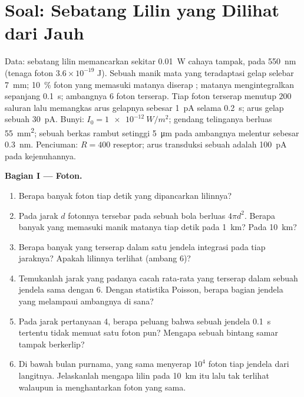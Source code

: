 \section{Soal: Sebatang Lilin yang Dilihat dari Jauh}

\begin{problem}
\label{pb:b3:sensory-systems:1}
Data: sebatang lilin memancarkan sekitar \qty{0.01}{W} cahaya tampak, pada
\qty{550}{nm} (tenaga foton $3.6\times 10^{-19}$ J). Sebuah manik mata yang
teradaptasi gelap selebar \qty{7}{mm}; \qty{10}{\%} foton yang memasuki matanya
diserap ; matanya mengintegralkan sepanjang \qty{0.1}{s};
ambangnya $6$ foton terserap. Tiap foton terserap menutup $200$
saluran lalu memangkas arus gelapnya sebesar \qty{1}{pA} selama \qty{0.2}{s};
arus gelap sebuah  \qty{30}{pA}. Bunyi: $I_{0} =
\qty{1e-12}{W/m^2}$; gendang telinganya berluas \qty{55}{mm^2}; sebuah berkas rambut
setinggi \qty{5}{\micro m} pada ambangnya melentur sebesar \qty{0.3}{nm}.
Penciuman: $R = 400$ reseptor; arus transduksi sebuah  adalah
\qty{100}{pA} pada kejenuhannya.

\medskip
\noindent\textbf{Bagian I --- Foton.}
\begin{enumerate}
  \item Berapa banyak foton tiap detik yang dipancarkan lilinnya?
  \item Pada jarak $d$ fotonnya tersebar pada sebuah bola berluas
        $4\pi d^{2}$. Berapa banyak yang memasuki manik matanya tiap detik pada
        \qty{1}{km}? Pada \qty{10}{km}?
  \item Berapa banyak yang terserap dalam satu jendela integrasi pada tiap
        jaraknya? Apakah lilinnya terlihat (ambang $6$)?
  \item Temukanlah jarak yang padanya cacah rata-rata yang terserap dalam sebuah jendela
        sama dengan $6$. Dengan statistika Poisson, berapa bagian jendela yang
        melampaui ambangnya di sana?
  \item Pada jarak pertanyaan 4, berapa peluang bahwa sebuah
        jendela \qty{0.1}{s} tertentu tidak memuat satu foton pun? Mengapa sebuah
        bintang samar tampak berkerlip?
  \item Di bawah bulan purnama,  yang sama menyerap $10^{4}$ foton tiap
        jendela dari langitnya. Jelaskanlah mengapa lilin pada \qty{10}{km} itu
        lalu tak terlihat walaupun ia menghantarkan foton yang sama.
\end{enumerate}


\end{problem}
